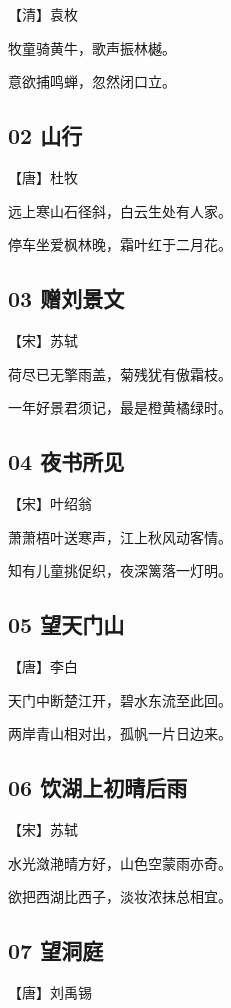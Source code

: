 \documentclass[a6paper, 12pt]{article}
\begin{document}
【清】袁枚

牧童骑黄牛，歌声振林樾。

意欲捕鸣蝉，忽然闭口立。

\subsection*{02 山行}

【唐】杜牧

远上寒山石径斜，白云生处有人家。

停车坐爱枫林晚，霜叶红于二月花。

\subsection*{03 赠刘景文}

【宋】苏轼

荷尽已无擎雨盖，菊残犹有傲霜枝。

一年好景君须记，最是橙黄橘绿时。

\subsection*{04 夜书所见}

【宋】叶绍翁

萧萧梧叶送寒声，江上秋风动客情。

知有儿童挑促织，夜深篱落一灯明。

\subsection*{05 望天门山}

【唐】李白

天门中断楚江开，碧水东流至此回。

两岸青山相对出，孤帆一片日边来。

\subsection*{06 饮湖上初晴后雨}

【宋】苏轼

水光潋滟晴方好，山色空蒙雨亦奇。

欲把西湖比西子，淡妆浓抹总相宜。

\subsection*{07 望洞庭}

【唐】刘禹锡
\end{document}
